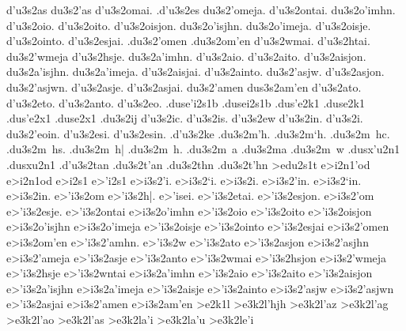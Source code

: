 {	d'u3s2as du3s2'as
	d'u3s2omai.
	.d'u3s2es
	du3s2'omeja.
	d'u3s2ontai.
	du3s2o'imhn.
	d'u3s2oio.
	d'u3s2oito.
	d'u3s2oisjon.
	du3s2o'isjhn.
	du3s2o'imeja.
	d'u3s2oisje.
	d'u3s2ointo.
	d'u3s2esjai.
	.du3s2'omen		%
	.du3s2om'en
	d'u3s2wmai.
	d'u3s2htai.
	du3s2'wmeja
	d'u3s2hsje.
	du3s2a'imhn.
	d'u3s2aio.
	d'u3s2aito.
	d'u3s2aisjon.
	du3s2a'isjhn.
	du3s2a'imeja.
	d'u3s2aisjai.
	d'u3s2ainto.
	du3s2'asjw.
	d'u3s2asjon.
	du3s2'asjwn.
	d'u3s2asje.
	d'u3s2asjai.
	du3s2'amen  		%
	dus3s2am'en
	d'u3s2ato.   		%
	d'u3s2eto.  		%
	d'u3s2anto.  		%
	d'u3s2eo. 		%
.duse'i2s1b 		%
.dusei2s1b
.dus'e2k1  		%
.duse2k1
.dus'e2x1  		%
.duse2x1
	.du3s2ij    		%
	d'u3s2ic.		%
	d'u3s2is.
	d'u3s2ew
	d'u3s2in.
	d'u3s2i.
	du3s2'eoin.
	d'u3s2esi.
	d'u3s2esin.
	.d'u3s2ke   		%
	.du3s2m'h.  		%
	.du3s2m`h.
	.du3s2m~hc.
	.du3s2m~hs.
	.du3s2m~h|
	.du3s2m~h.
	.du3s2m~a
	.du3s2ma
	.du3s2m~w
.dusx'u2n1  		%
.dusxu2n1
	.d'u3s2tan  		%
	.du3s2t'an
	.du3s2thn  		%
	.du3s2t'hn
>edu2s1t 		%
e>i2n1'od   		%
e>i2n1od
e>i2s1  		%
e>'i2s1
	e>i3s2'i.   		%
	e>i3s2`i.
	e>i3s2i.
	e>i3s2'in.
	e>i3s2`in.
	e>i3s2in.
	e>'i3s2om   		%
	e>'i3s2h|. e>'isei.
	e>'i3s2etai.
	e>'i3s2esjon.
	e>i3s2'om		%
	e>'i3s2esje.
	e>'i3s2ontai
%
	e>i3s2o'imhn
	e>'i3s2oio
	e>'i3s2oito
	e>'i3s2oisjon
	e>i3s2o'isjhn
	e>i3s2o'imeja
	e>'i3s2oisje
	e>'i3s2ointo
%
	e>'i3s2esjai
	e>i3s2'omen		%
	e>i3s2om'en
%
	e>'i3s2'amhn.
	e>'i3s2w
	e>'i3s2ato
	e>'i3s2asjon
	e>i3s2'asjhn
	e>i3s2'ameja
	e>'i3s2asje
	e>'i3s2anto
%
	e>'i3s2wmai
	e>'i3s2hsjon
	e>i3s2'wmeja
	e>'i3s2hsje
	e>'i3s2wntai
%
	e>i3s2a'imhn
	e>'i3s2aio
	e>'i3s2aito
	e>'i3s2aisjon
	e>'i3s2a'isjhn
	e>i3s2a'imeja
	e>'i3s2aisje
	e>'i3s2ainto
%
	e>i3s2'asjw
	e>i3s2'asjwn
%
	e>'i3s2asjai
	e>i3s2'amen		%
	e>i3s2am'en
%
>e2k1l 			%
	>e3k2l'hjh  		%
	>e3k2l'az   		%
	>e3k2l'ag  		%
	>e3k2l'ao		%
	>e3k2l'as		%
	>e3k2la'i		%
	>e3k2la'u   		%
	>e3k2le'i		%
}
